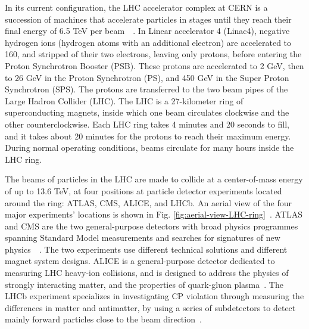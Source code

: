 In its current configuration, the LHC accelerator complex at CERN is a succession of machines that accelerate particles in stages until they reach their final energy of 6.5 TeV per beam~\cite{CERN-OPEN-2000-148}~\cite{Linac4-design-report-2020}. In Linear accelerator 4 (Linac4), negative hydrogen ions (hydrogen atoms with an additional electron) are accelerated to 160\MeV, and stripped of their two electrons, leaving only protons, before entering the Proton Synchrotron Booster (PSB). These protons are accelerated to 2 GeV, then to 26 GeV in the Proton Synchrotron (PS), and 450 GeV in the Super Proton Synchrotron (SPS). The protons are transferred to the two beam pipes of the Large Hadron Collider (LHC). The LHC is a 27-kilometer ring of superconducting magnets, inside which one beam circulates clockwise and the other counterclockwise. Each LHC ring takes 4 minutes and 20 seconds to fill, and it takes about 20 minutes for the protons to reach their maximum energy. During normal operating conditions, beams circulate for many hours inside the LHC ring. 

The beams of particles in the LHC are made to collide at a center-of-mass energy of up to 13.6 TeV, at four positions at particle detector experiments located around the ring: ATLAS, CMS, ALICE, and LHCb. An aerial view of the four major experiments' locations is shown in Fig. \ref{fig:aerial-view-LHC-ring}~\cite{OPEN-PHO-ACCEL-2017-005}. ATLAS and CMS are the two general-purpose detectors with broad physics programmes spanning Standard Model measurements and searches for signatures of new physics~\cite{ATLAS-TDR-14}~\cite{CERN-LHCC-2006-001}. The two experiments use different technical solutions and different magnet system designs. ALICE is a general-purpose detector dedicated to measuring LHC heavy-ion collisions, and is designed to address the physics of strongly interacting matter, and the properties of quark-gluon plasma~\cite{ALICE-original-TDR}. The LHCb experiment specializes in investigating CP violation through measuring the differences in matter and antimatter, by using a series of subdetectors to detect mainly forward particles close to the beam direction~\cite{LHCb-1998}. 

